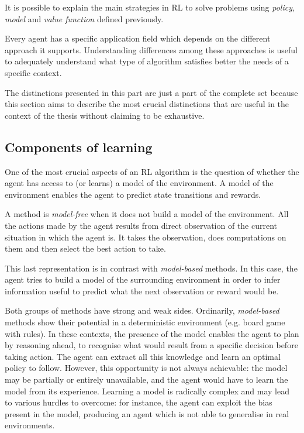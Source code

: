 It is possible to explain the main strategies in RL to solve problems using \textit{policy}, \textit{model} and \textit{value function} defined previously.

Every agent has a specific application field which depends on the different approach it supports.
Understanding differences among these approaches is useful to adequately understand what type of algorithm satisfies better the needs of a specific context.

The distinctions presented in this part are just a part of the complete set because this section aims to describe the most crucial distinctions that are useful in the context of the thesis without claiming to be exhaustive.

\subsection{Components of learning}

One of the most crucial aspects of an RL algorithm is the question of whether the agent has access to (or learns) a model of the environment. A model of the environment enables the agent to predict state transitions and rewards.

A method is \textit{model-free} when it does not build a model of the environment. All the actions made by the agent results from direct observation of the current situation in which the agent is. It takes the observation, does computations on them and then select the best action to take.

This last representation is in contrast with \textit{model-based} methods. In this case, the agent tries to build a model of the surrounding environment in order to infer information useful to predict what the next observation or reward would be.

Both groups of methods have strong and weak sides.
Ordinarily, \textit{model-based} methods show their potential in a deterministic environment (e.g. board game with rules). In these contexts, the presence of the model enables the agent to plan by reasoning ahead, to recognise what would result from a specific decision before taking action. The agent can extract all this knowledge and learn an optimal policy to follow. However, this opportunity is not always achievable: the model may be partially or entirely unavailable, and the agent would have to learn the model from its experience. Learning a model is radically complex and may lead to various hurdles to overcome: for instance, the agent can exploit the bias present in the model, producing an agent which is not able to generalise in real environments.

